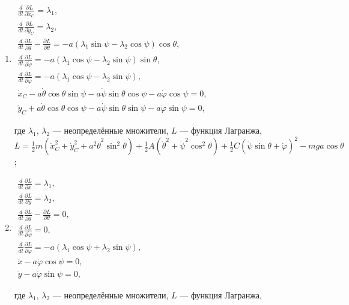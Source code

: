 \begin{enumerate}
\item $\begin{array}{ll}
	\frac{d}{dt}\frac{\partial L}{\partial \dot{x}_C} = \lambda _1,\\
	\frac{d}{dt}\frac{\partial L}{\partial \dot{y}_C} = \lambda _2,\\
	\frac{d}{dt}\frac{\partial L}{\partial\dot{\theta}} -
	\frac{\partial L}{\partial\theta} =
	-a(\lambda _1\sin{\psi} - \lambda _2\cos{\psi})\cos{\theta},\\
	\frac{d}{dt}\frac{\partial L}{\partial\dot{\psi}} =
	-a(\lambda _1\cos{\psi} - \lambda _2\sin{\psi})\sin{\theta},\\
	\frac{d}{dt}\frac{\partial L}{\partial\dot{\varphi}} =
	-a(\lambda _1\cos{\psi} - \lambda _2\sin{\psi}),\\
	\dot{x}_C - a\dot{\theta}\cos{\theta}\sin{\psi} -
	a\dot{\psi}\sin{\theta}\cos{\psi} - a\dot{\varphi}\cos{\psi} = 0,\\
	\dot{y}_C + a\dot{\theta}\cos{\theta}\cos{\psi} -
	a\dot{\psi}\sin{\theta}\sin{\psi} - a\dot{\varphi}\sin{\psi} = 0,
\end{array}$

где $\lambda _1$, $\lambda _2$ --- неопределённые множители,
$L$ --- функция Лагранжа,
$L = \frac{1}{2} m
(\dot{x}^2_C + \dot{y}^2_C + a^2\dot{\theta}^2\sin^2{\theta}) +
\frac{1}{2}A(\dot{\theta}^2 + \dot{\psi}^2\cos^2{\theta}) +
\frac{1}{2}C(\dot{\psi}\sin{\theta} + \dot{\varphi})^2 -
mga\cos{\theta}$;
\item $\begin{array}{ll}
	\frac{d}{dt}\frac{\partial L}{\partial\dot{x}} = \lambda _1,\\
	\frac{d}{dt}\frac{\partial L}{\partial\dot{y}} = \lambda _2,\\
	\frac{d}{dt}\frac{\partial L}{\partial\dot{\theta}} -
	\frac{\partial L}{\partial\theta} = 0,\\
	\frac{d}{dt}\frac{\partial L}{\partial\dot{\psi}} = 0,\\
	\frac{d}{dt}\frac{\partial L}{\partial\dot{\varphi}} =
	-a(\lambda _1\cos{\psi} + \lambda _2\sin{\psi}),\\
	\dot{x} -a\dot{\varphi}\cos{\psi} = 0,\\
	\dot{y} -a\dot{\varphi}\sin{\psi} = 0,
\end{array}$

где $\lambda _1$, $\lambda _2$ --- неопределённые множители,
$L$ --- функция Лагранжа,


\end{enumerate}
